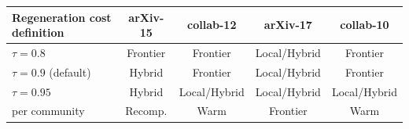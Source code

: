 \begin{tabular}{l cccc}
\toprule
Regeneration cost definition & arXiv-15 & collab-12 & arXiv-17 & collab-10\\
\midrule
$\tau{=}0.8$ & Frontier & Frontier & Local/Hybrid & Frontier \\
$\tau{=}0.9$ (default) & Hybrid & Frontier & Local/Hybrid & Frontier \\
$\tau{=}0.95$ & Hybrid & Local/Hybrid & Local/Hybrid & Local/Hybrid \\
per community & Recomp. & Warm & Frontier & Warm \\
\bottomrule
\end{tabular}
